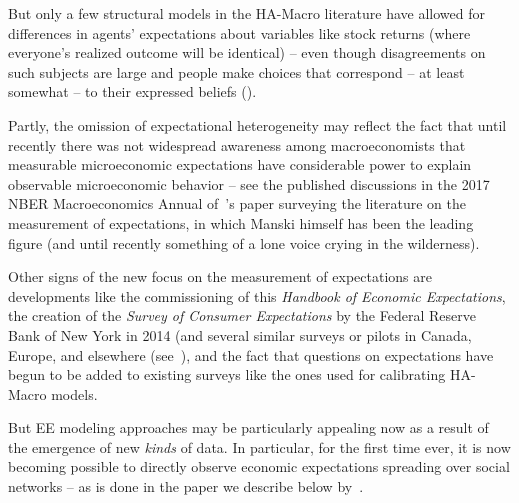     But only a few structural models in the HA-Macro literature have allowed for differences in agents' expectations about variables like stock returns (where everyone's realized outcome will be identical) -- even though disagreements on such subjects are large and people make choices that correspond -- at least somewhat --  to their expressed beliefs (\cite{gmsuBeliefs}).

    Partly, the omission of expectational heterogeneity may reflect the fact that until recently there was not widespread awareness among macroeconomists that measurable microeconomic expectations have considerable power to explain observable microeconomic behavior -- see the published discussions in the 2017 NBER Macroeconomics Annual of~\cite{manski2017survey}'s paper surveying the literature on the measurement of expectations, in which Manski himself has been the leading figure (and until recently something of a lone voice crying in the wilderness).%

    Other signs of the new focus on the measurement of expectations are developments like the commissioning of this \emph{Handbook of Economic Expectations}, the creation of the \emph{Survey of Consumer Expectations} by the Federal Reserve Bank of New York in 2014 %
    (and several similar surveys or pilots in Canada, Europe, and elsewhere (see~\cite{bdk2021household}), and the fact that questions on expectations have begun to be added to existing surveys like the ones used for calibrating HA-Macro models.  %

    But EE modeling approaches may be particularly appealing now as a result of the emergence of new \emph{kinds} of data.  In particular, for the first time ever, it is now becoming possible to directly observe economic expectations spreading over social networks -- as is done in the paper we describe below by~\cite{bailey2018economic}.


